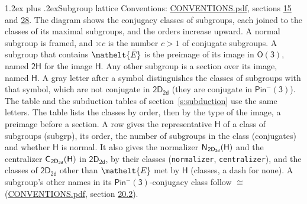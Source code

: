 \documentclass[10pt,a4paper]{article}
\makeatletter
\renewcommand\section{\@startsection{section}{1}{\z@}{-3ex plus -1ex minus -.2ex}%
  {1.2ex plus .2ex}{\normalfont\large\sffamily\bfseries\color{parttitle}}}
\numberwithin{equation}{section}
\newcommand{\eltfont}[1]{{\let\sigma\eltsigma\mathelt{#1}}}
\newcommand{\grp}[1]{\mathsf{#1}}
\newcommand{\cls}[1]{\eltfont{#1}}
\newcommand{\elt}[1]{\eltfont{#1}}
\newcommand{\samecls}{\cong}
\newcommand{\barred}[1]{\bar{#1}}
\newcommand{\hairsp}{\mkern1mu}
\makeatother
\begin{document}
\section{Subgroup lattice}\label{s:subgroups}
Conventions: \href{../../CONVENTIONS.pdf}{CONVENTIONS.pdf}, sections \href{../../../rotation/CONVENTIONS.pdf\#conv.15}{15} and \href{../../CONVENTIONS.pdf\#conv.28}{28}.
The diagram shows the conjugacy classes of subgroups, each joined to the classes of its maximal subgroups, and the orders increase upward. \label{n:index.conjugates.c}\label{n:mark.conjugates}A normal subgroup is framed, and ${\times}c$ is the number $c > 1$ of conjugate subgroups. \label{n:group.H}A subgroup that contains $\elt{\barred{E}}$ is the preimage of its image in $\grp{O(3)}$, named $\grp{2H}$ for the image $\grp{H}$. Any other subgroup is a section over its image, named $\grp{H}$. \label{n:mark.letter}A gray letter after a symbol distinguishes the classes of subgroups with that symbol, which are not conjugate in $\grp{2D_{2d}}$ (they are conjugate in \href{Pinminus3.pdf}{$\grp{Pin^{-}(3)}$}). The table and the subduction tables of section~\ref{s:subduction} use the same letters. The table lists the classes by order, then by the type of the image, a preimage before a section. \label{n:head.subgroup}\label{n:head.order}\label{n:head.conjugates}\label{n:head.normal}A row gives the representative $\grp{H}$ of a class of subgroups (subgrp), its order, the number of subgroups in the class (conjugates) and whether $\grp{H}$ is normal. \label{n:group.normalizer}\label{n:group.centralizer}\label{n:head.classes}It also gives the normalizer $\grp{N}_{\hairsp \grp{2D_{2d}}}(\grp{H})$ and the centralizer $\grp{C}_{\hairsp \grp{2D_{2d}}}(\grp{H})$ in $\grp{2D_{2d}}$, by their classes (\texttt{normalizer}, \texttt{centralizer}), and the classes of $\grp{2D_{2d}}$ other than $\cls{E}$ met by $\grp{H}$ (classes, a dash for none). A subgroup's other names in its \href{Pinminus3.pdf}{$\grp{Pin^{-}(3)}$}-conjugacy class follow $\samecls$ (\href{../../CONVENTIONS.pdf}{CONVENTIONS.pdf}, section \href{../../CONVENTIONS.pdf\#conv.20.2}{20.2}).
\end{document}
